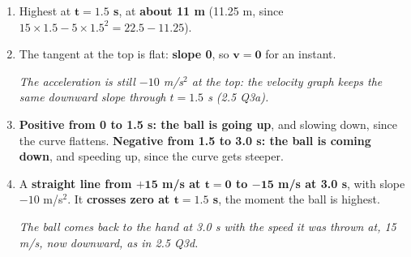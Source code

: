 \documentclass[12pt, twoside]{article}
\begin{document}
\begin{enumerate}[itemsep=0.4cm]
  \begin{enumerate}[itemsep=0.3cm]
    \item Highest at \textbf{$\mathbf{t = 1.5}$ s}, at \textbf{about 11 m}
      (11.25 m, since $15 \times 1.5 - 5 \times 1.5^2 = 22.5 - 11.25$).
    \item The tangent at the top is flat: \textbf{slope 0}, so \textbf{$\mathbf{v = 0}$}
      for an instant.

      \emph{The acceleration is still $-10$ m/s$^2$ at the top: the velocity graph
      keeps the same downward slope through $t = 1.5$ s (2.5 Q3a).}
    \item \textbf{Positive from 0 to 1.5 s: the ball is going up}, and slowing down,
      since the curve flattens. \textbf{Negative from 1.5 to 3.0 s: the ball is coming
      down}, and speeding up, since the curve gets steeper.
    \item A \textbf{straight line from $\mathbf{+15}$ m/s at $\mathbf{t = 0}$ to
      $\mathbf{-15}$ m/s at 3.0 s}, with slope $-10$ m/s$^2$. It \textbf{crosses
      zero at $\mathbf{t = 1.5}$ s}, the moment the ball is highest.

      \emph{The ball comes back to the hand at 3.0 s with the speed it was thrown
      at, 15 m/s, now downward, as in 2.5 Q3d.}
  \end{enumerate}

\end{enumerate}
\end{document}
